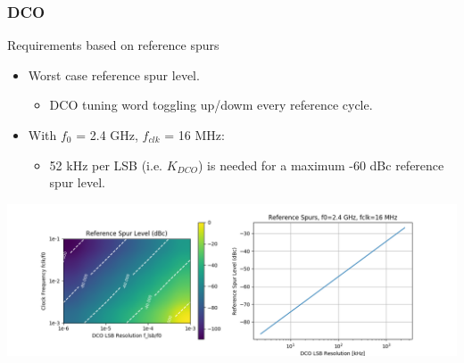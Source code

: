 \documentclass[t, screen, aspectratio=43]{beamer}
\begin{document}
\begin{frame}
	\frametitle{DCO}
	\begin{block}{Requirements based on reference spurs}
		\vspace{-.2em}
		\begin{itemize}
			\footnotesize
			\item Worst case reference spur level.
				\begin{itemize}
					\scriptsize			
					\item DCO tuning word toggling up/dowm every reference cycle.
				\end{itemize} 	
			\item With $f_0$ = 2.4 GHz, $f_{clk}$ = 16 MHz:
			\begin{itemize}
				\scriptsize			
				\item 52 kHz per LSB (i.e. $K_{DCO}$) is needed for a maximum -60 dBc reference spur level. 
			\end{itemize} 
		\end{itemize}  
		\vspace{-1em}
		\center\includegraphics[width=1.0\textwidth, angle=0]{refspur_level.png}
		\vspace{-0.5em}  
	\end{block}
\end{frame}
\end{document}
